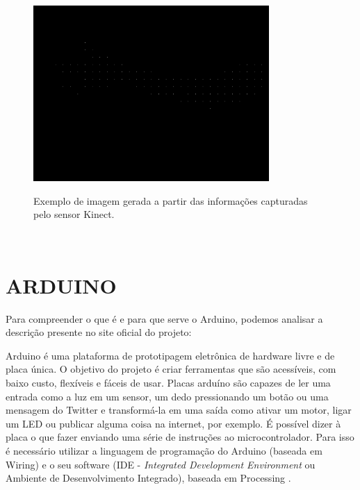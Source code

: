 \begin{figure}[H]
    \centering
    \caption{Exemplo de imagem gerada a partir  das informações capturadas  pelo sensor Kinect.}
	\vspace*{0,2cm}
    \includegraphics[width=0.8\textwidth]{./04-figuras/kinect_exemplo}
    \label{fig:kinect_exemplo}
\end{figure}
\vspace*{-0,9cm}
{\raggedright {}}\\


\section{ARDUINO}

Para compreender o que é e para que serve o Arduino, podemos analisar a descrição presente no site oficial do projeto:

\begin{citacao}
Arduino é uma plataforma de prototipagem eletrônica de hardware livre e de placa única. O objetivo do projeto é criar ferramentas que são acessíveis, com baixo custo, flexíveis e fáceis de usar. Placas arduíno são capazes de ler uma entrada como a luz em um sensor, um dedo pressionando um botão ou uma mensagem do Twitter e transformá-la em uma saída como ativar um motor, ligar um LED ou publicar alguma coisa na internet, por exemplo. É possível dizer à placa o que fazer enviando uma série de instruções ao microcontrolador. Para isso é necessário utilizar a linguagem de programação do Arduino (baseada em Wiring) e o seu software (IDE - \textit{Integrated Development Environment} ou Ambiente de Desenvolvimento Integrado), baseada em Processing \cite{arduino}. 
\end{citacao}


